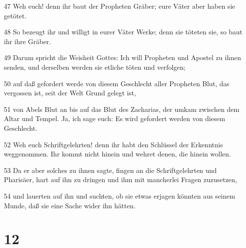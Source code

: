 \par 47 Weh euch! denn ihr baut der Propheten Gräber; eure Väter aber haben sie getötet.
\par 48 So bezeugt ihr und willigt in eurer Väter Werke; denn sie töteten sie, so baut ihr ihre Gräber.
\par 49 Darum spricht die Weisheit Gottes: Ich will Propheten und Apostel zu ihnen senden, und derselben werden sie etliche töten und verfolgen;
\par 50 auf daß gefordert werde von diesem Geschlecht aller Propheten Blut, das vergossen ist, seit der Welt Grund gelegt ist,
\par 51 von Abels Blut an bis auf das Blut des Zacharias, der umkam zwischen dem Altar und Tempel. Ja, ich sage euch: Es wird gefordert werden von diesem Geschlecht.
\par 52 Weh euch Schriftgelehrten! denn ihr habt den Schlüssel der Erkenntnis weggenommen. Ihr kommt nicht hinein und wehret denen, die hinein wollen.
\par 53 Da er aber solches zu ihnen sagte, fingen an die Schriftgelehrten und Pharisäer, hart auf ihn zu dringen und ihm mit mancherlei Fragen zuzusetzen,
\par 54 und lauerten auf ihn und suchten, ob sie etwas erjagen könnten aus seinem Munde, daß sie eine Sache wider ihn hätten.

\chapter{12}

